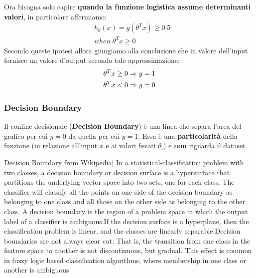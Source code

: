 Ora bisogna solo capire \textbf{quando la funzione logistica assume determinanti valori}, in particolare affermiamo:
\begin{align*}& h_\theta(x) = g(\theta^T x) \geq 0.5 \\& when \; \theta^T x \geq 0\end{align*}
Secondo queste ipotesi allora giungiamo alla conclusione che in valore dell'input fornisce un valore d'output secondo tale approssimazione:
\begin{align*}& \theta^T x \geq 0 \Rightarrow y = 1 \\& \theta^T x < 0 \Rightarrow y = 0 \newline\end{align*}
\subsubsection{Decision Boundary}
Il confine decisionale (\textbf{Decision Boundary}) è una linea che separa l'area del grafico per cui $y=0$ da quella per cui $y=1$. Essa è una \textbf{particolarità} della funzione (in relazione all'input $x$ e ai valori fissati $\theta_i$) e \textbf{non} riguarda il dataset.
\begin{definizione}[]Decision Boundary from Wikipedia]
  In a statistical-classification problem with two classes, a decision boundary \cite{ConfineDecisionale} or decision surface is a hypersurface that partitions the underlying vector space into two sets, one for each class. The classifier will classify all the points on one side of the decision boundary as belonging to one class and all those on the other side as belonging to the other class. A decision boundary is the region of a problem space in which the output label of a classifier is ambiguous.If the decision surface is a hyperplane, then the classification problem is linear, and the classes are linearly separable.Decision boundaries are not always clear cut. That is, the transition from one class in the feature space to another is not discontinuous, but gradual. This effect is common in fuzzy logic based classification algorithms, where membership in one class or another is ambiguous
\end{definizione}
